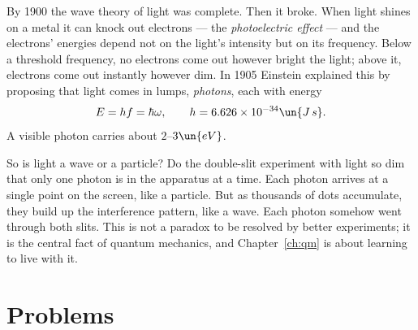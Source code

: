 By 1900 the wave theory of light was complete. Then it broke. When light shines on a metal it can knock out electrons --- the \emph{photoelectric effect} --- and the electrons' energies depend not on the light's intensity but on its frequency. Below a threshold frequency, no electrons come out however bright the light; above it, electrons come out instantly however dim. In 1905 Einstein explained this by proposing that light comes in lumps, \emph{photons}, each with energy
\[
  E = hf = \hbar\omega, \qquad h = 6.626\times10^{-34}\un{J\,s}.
\]
A visible photon carries about $2$--$3\un{eV}$.

So is light a wave or a particle? Do the double-slit experiment with light so dim that only one photon is in the apparatus at a time. Each photon arrives at a single point on the screen, like a particle. But as thousands of dots accumulate, they build up the interference pattern, like a wave. Each photon somehow went through both slits. This is not a paradox to be resolved by better experiments; it is the central fact of quantum mechanics, and Chapter~\ref{ch:qm} is about learning to live with it.

\section{Problems}

